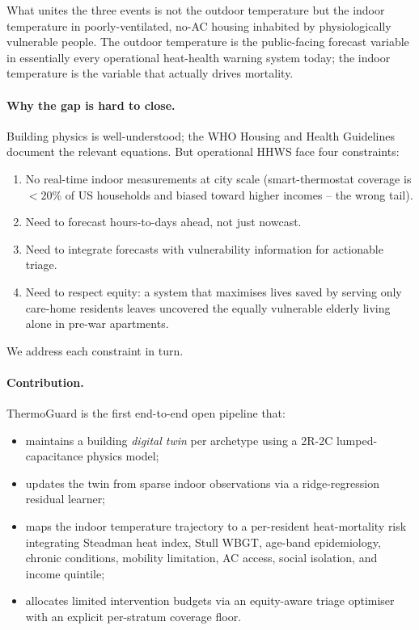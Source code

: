 \documentclass[11pt]{article}
\begin{document}
What unites the three events is not the outdoor temperature but the indoor temperature in poorly-ventilated, no-AC housing inhabited by physiologically vulnerable people.  The outdoor temperature is the public-facing forecast variable in essentially every operational heat-health warning system today; the indoor temperature is the variable that actually drives mortality.

\paragraph{Why the gap is hard to close.}  Building physics is well-understood; the WHO Housing and Health Guidelines \citep{whoheat2018} document the relevant equations.  But operational HHWS face four constraints:

\begin{enumerate}[leftmargin=2em]
\item No real-time indoor measurements at city scale (smart-thermostat coverage is $<20\%$ of US households and biased toward higher incomes -- the wrong tail).
\item Need to forecast hours-to-days ahead, not just nowcast.
\item Need to integrate forecasts with vulnerability information for actionable triage.
\item Need to respect equity: a system that maximises lives saved by serving only care-home residents leaves uncovered the equally vulnerable elderly living alone in pre-war apartments.
\end{enumerate}

We address each constraint in turn.

\paragraph{Contribution.}  ThermoGuard is the first end-to-end open pipeline that:
\begin{itemize}[leftmargin=2em]
\item maintains a building \emph{digital twin} per archetype using a 2R-2C lumped-capacitance physics model;
\item updates the twin from sparse indoor observations via a ridge-regression residual learner;
\item maps the indoor temperature trajectory to a per-resident heat-mortality risk integrating Steadman heat index, Stull WBGT, age-band epidemiology, chronic conditions, mobility limitation, AC access, social isolation, and income quintile;
\item allocates limited intervention budgets via an equity-aware triage optimiser with an explicit per-stratum coverage floor.
\end{itemize}
\end{document}
